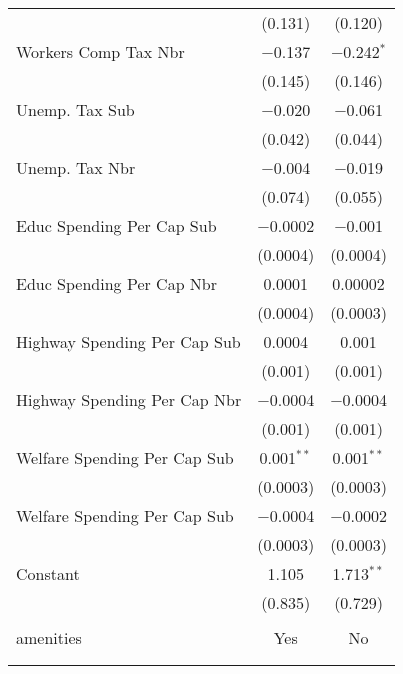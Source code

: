 \begin{table}[!htbp]
\begin{tabular}{@{\extracolsep{5pt}}lcc}
  & (0.131) & (0.120) \\ 
  Workers Comp Tax Nbr & $-$0.137 & $-$0.242$^{*}$ \\ 
  & (0.145) & (0.146) \\ 
  Unemp. Tax Sub & $-$0.020 & $-$0.061 \\ 
  & (0.042) & (0.044) \\ 
  Unemp. Tax Nbr & $-$0.004 & $-$0.019 \\ 
  & (0.074) & (0.055) \\ 
  Educ Spending Per Cap Sub & $-$0.0002 & $-$0.001 \\ 
  & (0.0004) & (0.0004) \\ 
  Educ Spending Per Cap Nbr & 0.0001 & 0.00002 \\ 
  & (0.0004) & (0.0003) \\ 
  Highway Spending Per Cap Sub & 0.0004 & 0.001 \\ 
  & (0.001) & (0.001) \\ 
  Highway Spending Per Cap Nbr & $-$0.0004 & $-$0.0004 \\ 
  & (0.001) & (0.001) \\ 
  Welfare Spending Per Cap Sub & 0.001$^{**}$ & 0.001$^{**}$ \\ 
  & (0.0003) & (0.0003) \\ 
  Welfare Spending Per Cap Sub & $-$0.0004 & $-$0.0002 \\ 
  & (0.0003) & (0.0003) \\ 
  Constant & 1.105 & 1.713$^{**}$ \\ 
  & (0.835) & (0.729) \\ 
 \hline \\[-1.8ex] 
amenities & Yes & No \\ 
\hline \\[-1.8ex] 
\hline 
\hline \\[-1.8ex] 
\end{tabular} 
\end{table} 
